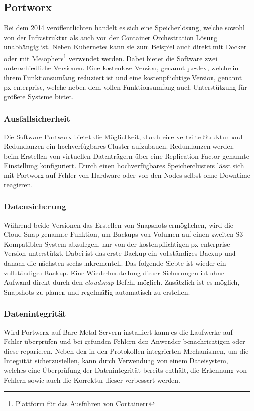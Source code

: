 \subsection{Portworx}
Bei dem 2014 veröffentlichten \cite{portworx:date} handelt es sich eine Speicherlösung, welche sowohl von der Infrastruktur als auch von der Container Orchestration Lösung unabhängig ist. Neben Kubernetes kann sie zum Beispiel auch direkt mit Docker oder mit Mesophere\footnote{Plattform für das Ausführen von Containern} verwendet werden. Dabei bietet die Software zwei unterschiedliche Versionen. Eine kostenlose Version, genannt px-dev, welche in ihrem Funktionsumfang reduziert ist und eine kostenpflichtige Version, genannt px-enterprise, welche neben dem vollen Funktionsumfang auch Unterstützung für größere Systeme bietet.

\subsubsection{Ausfallsicherheit}
Die Software Portworx bietet die Möglichkeit, durch eine verteilte Struktur und Redundanzen ein hochverfügbares Cluster aufzubauen. Redundanzen werden beim Erstellen von virtuellen Datenträgern über eine Replication Factor genannte Einstellung konfiguriert. Durch einen hochverfügbares Speicherclusters lässt sich mit Portworx auf Fehler von Hardware oder von den Nodes selbst ohne Downtime reagieren.

\subsubsection{Datensicherung}
Während beide Versionen das Erstellen von Snapshots ermöglichen, wird die Cloud Snap genannte Funktion, um Backups von Volumen auf einen zweiten S3 Kompatiblen System abzulegen, nur von der kostenpflichtigen px-enterprise Version unterstützt. Dabei ist das erste Backup ein vollständiges Backup und danach die nächsten sechs inkrementell. Das folgende Siebte ist wieder ein vollständiges Backup. Eine Wiederherstellung dieser Sicherungen ist ohne Aufwand direkt durch den \textit{cloudsnap} Befehl möglich. Zusätzlich ist es möglich, Snapshots zu planen und regelmäßig automatisch zu erstellen.

\subsubsection{Datenintegrität}
Wird Portworx auf Bare-Metal Servern installiert kann es die Laufwerke auf Fehler überprüfen und bei gefunden Fehlern den Anwender benachrichtigen oder diese reparieren. Neben den in den Protokollen integrierten Mechanismen, um die Integrität sicherzustellen, kann durch Verwendung von einem Dateisystem, welches eine Überprüfung der Datenintegrität bereits enthält, die Erkennung von Fehlern sowie auch die Korrektur dieser verbessert werden.

